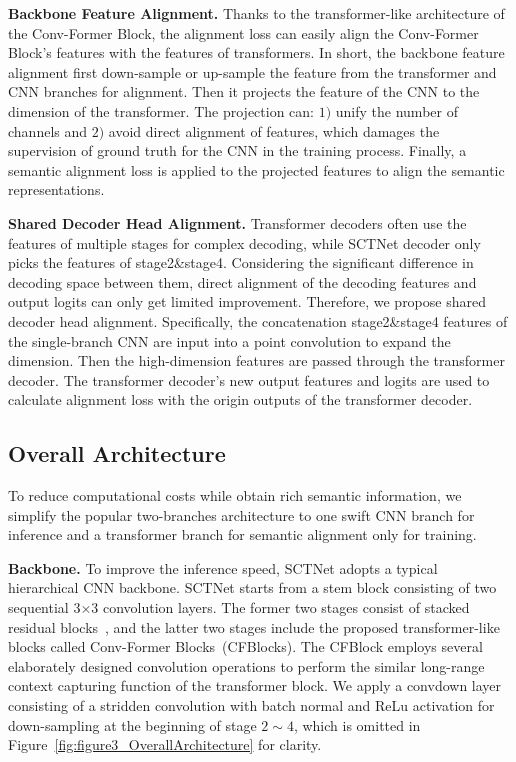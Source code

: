 \documentclass[letterpaper]{article} %
\begin{document}
\noindent
{\bf Backbone Feature Alignment.} 
Thanks to the transformer-like architecture of the Conv-Former Block, the alignment loss can easily align the Conv-Former Block's features with the features of transformers. In short, the backbone feature alignment first down-sample or up-sample the feature from the transformer and CNN branches for alignment. Then it projects the feature of the CNN to the dimension of the transformer. The projection can: $1)$ unify the number of channels and $2)$ avoid direct alignment of features, which damages the supervision of ground truth for the CNN in the training process. Finally, a semantic alignment loss is applied to the projected features to align the semantic representations.

\noindent
{\bf Shared Decoder Head Alignment.} 
Transformer decoders often use the features of multiple stages for complex decoding, while SCTNet decoder only picks the features of stage2\&stage4. Considering the significant difference in decoding space between them, direct alignment of the decoding features and output logits can only get limited improvement. Therefore, we propose shared decoder head alignment. Specifically, the concatenation stage2\&stage4 features of the single-branch CNN are input into a point convolution to expand the dimension. Then the high-dimension features are passed through the transformer decoder. The transformer decoder's new output features and logits are used to calculate alignment loss with the origin outputs of the transformer decoder.


\subsection{Overall Architecture}
To reduce computational costs while obtain rich semantic information, we simplify the popular two-branches architecture to one swift CNN branch for inference and a transformer branch for semantic alignment only for training.

\noindent
{\bf Backbone.} 
To improve the inference speed, SCTNet adopts a typical hierarchical CNN backbone. SCTNet starts from a stem block consisting of two sequential 3$\times$3 convolution layers. The former two stages consist of stacked residual blocks~\cite{he2016deep}, and the latter two stages include the proposed transformer-like blocks called Conv-Former Blocks~(CFBlocks). The CFBlock employs several elaborately designed convolution operations to perform the similar long-range context capturing function of the transformer block. We apply a convdown layer consisting of a stridden convolution with batch normal and ReLu activation for down-sampling at the beginning of stage $2\sim4$, which is omitted in Figure~\ref{fig:figure3_OverallArchitecture} for clarity. 
\end{document}
